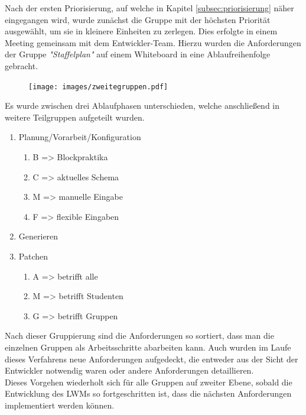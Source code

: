Nach der ersten Priorisierung, auf welche in Kapitel \ref{subsec:priorisierung} näher eingegangen wird, wurde zunächst die Gruppe mit der höchsten Priorität ausgewählt, um sie in kleinere Einheiten zu zerlegen. Dies erfolgte in einem Meeting gemeinsam mit dem Entwickler-Team. Hierzu wurden die Anforderungen der Gruppe \textit{"Staffelplan"} auf einem Whiteboard in eine Ablaufreihenfolge gebracht. 

\begin{figure}[!htb]
		\texttt{[image: images/zweitegruppen.pdf]}
\centering 
{} 
\end{figure}

Es wurde zwischen drei Ablaufphasen unterschieden, welche anschließend in weitere Teilgruppen aufgeteilt wurden.

\begin{enumerate}
\item Planung/Vorarbeit/Konfiguration
\begin{enumerate}
\item B => Blockpraktika
\item C => aktuelles Schema
\item M => manuelle Eingabe
\item F => flexible Eingaben
\end{enumerate}
\item Generieren
\item Patchen
\begin{enumerate}
\item A => betrifft alle
\item M => betrifft Studenten
\item G => betrifft Gruppen
\end{enumerate}
\end{enumerate}

Nach dieser Gruppierung sind die Anforderungen so sortiert, dass man die einzelnen Gruppen als Arbeitsschritte abarbeiten kann. Auch wurden im Laufe dieses Verfahrens neue Anforderungen aufgedeckt, die entweder aus der Sicht der Entwickler notwendig waren oder andere Anforderungen detaillieren. \\[1em]

Dieses Vorgehen wiederholt sich für alle Gruppen auf zweiter Ebene, sobald die Entwicklung des \ac{LWM}s so fortgeschritten ist, dass die nächsten Anforderungen implementiert werden können. 

